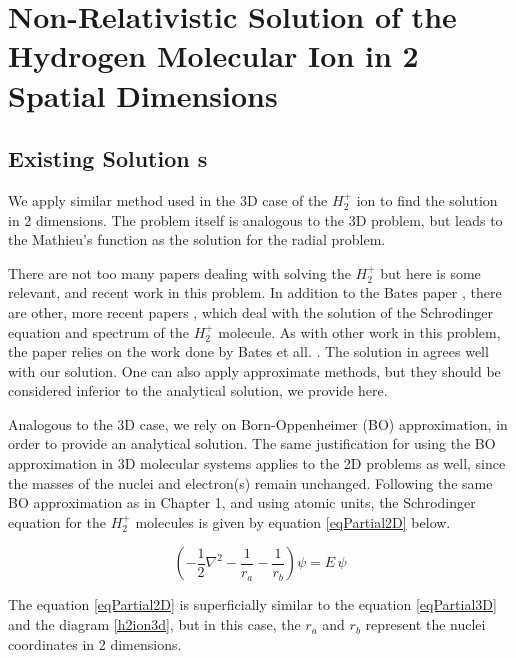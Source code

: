 \chapter{Non-Relativistic Solution of the Hydrogen Molecular Ion in 2 Spatial Dimensions}

\section{Existing Solution s}

We apply similar method used in the 3D case of the $ H_2^{+} $ ion to find the solution in 2 dimensions. The problem itself is analogous to the 3D problem, but leads to the Mathieu's function as the solution for the radial problem.

There are not too many papers dealing with solving the $ H_2^{+} $ but here is some relevant, and recent work in this problem. In addition to the Bates paper \cite{Bates1}, there are other, more recent papers \cite{H2Plus2d1} \cite{TwoCentersParticle}, \cite{Kolos} which deal with the solution of the Schrodinger equation and spectrum of the $ H_2^{+} $ molecule.  As with other work in this problem, the paper relies on the work done by Bates et all. \cite{Bates1}. The solution in \cite{H2Plus2d1} agrees well with our solution.  One can also apply approximate methods, but they should be considered inferior to the analytical solution, we provide here. 

Analogous to the 3D case, we rely on Born-Oppenheimer (BO) approximation, in order to provide an analytical solution. The same justification for using the BO approximation in 3D molecular systems applies to the 2D problems as well, since the masses of the nuclei and electron(s) remain unchanged.  Following the same BO approximation as in Chapter 1, and using atomic units, the Schrodinger equation for the $ H_2^{+} $ molecules is given by equation \eqref{eqPartial2D} below. 

\begin{equation}\label{eqPartial2D}
\left(-\frac{1}{2}\nabla^2-\frac{1}{r_a}-\frac{1}{r_b}\right)\psi = E\,\psi
\end{equation}

The equation \eqref{eqPartial2D} is superficially similar to the equation \eqref{eqPartial3D} and the diagram \ref{h2ion3d}, but in this case, the $ r_a $ and $ r_b $ represent the nuclei coordinates in 2 dimensions.

